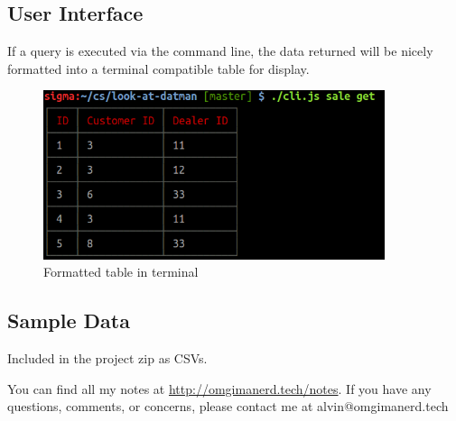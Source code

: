 \documentclass{math}
\begin{document}
\subsection*{User Interface}
If a query is executed via the command line, the data returned will be nicely
formatted into a terminal compatible table for display.
\begin{figure}[H]
  \centering
  \includegraphics[width=10cm]{assets/phase2_example_table.png}
  \caption{Formatted table in terminal}
\end{figure}

\subsection*{Sample Data}
Included in the project zip as CSVs.

\begin{center}
  You can find all my notes at \url{http://omgimanerd.tech/notes}. If you have
  any questions, comments, or concerns, please contact me at
  alvin@omgimanerd.tech
\end{center}
\end{document}
